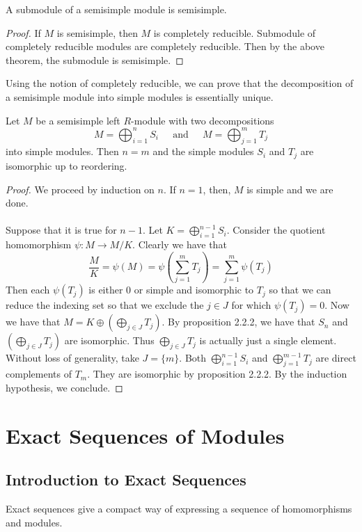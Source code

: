 \documentclass[a4paper]{article}
\begin{document}
\begin{crl}{}{} A submodule of a semisimple module is semisimple. 
\begin{proof}
If $M$ is semisimple, then $M$ is completely reducible. Submodule of completely reducible modules are completely reducible. Then by the above theorem, the submodule is semisimple. 
\end{proof}
\end{crl}

Using the notion of completely reducible, we can prove that the decomposition of a semisimple module into simple modules is essentially unique. 

\begin{prp}{}{} Let $M$ be a semisimple left $R$-module with two decompositions $$M=\bigoplus_{i=1}^nS_i\;\;\;\;\text{ and }\;\;\;\; M=\bigoplus_{j=1}^mT_j$$ into simple modules. Then $n=m$ and the simple modules $S_i$ and $T_j$ are isomorphic up to reordering. 
\begin{proof}
We proceed by induction on $n$. If $n=1$, then, $M$ is simple and we are done. \\~\\

Suppose that it is true for $n-1$. Let $K=\bigoplus_{i=1}^{n-1}S_i$. Consider the quotient homomorphism $\psi:M\to M/K$. Clearly we have that $$\frac{M}{K}=\psi(M)=\psi\left(\sum_{j=1}^mT_j\right)=\sum_{j=1}^m\psi(T_j)$$ Then each $\psi(T_j)$ is either $0$ or simple and isomorphic to $T_j$ so that we can reduce the indexing set so that we exclude the $j\in J$ for which $\psi(T_j)=0$. Now we have that $M=K\oplus\left(\bigoplus_{j\in J}T_j\right)$. By proposition 2.2.2, we have that $S_n$ and $\left(\bigoplus_{j\in J}T_j\right)$ are isomorphic. Thus $\bigoplus_{j\in J}T_j$ is actually just a single element. Without loss of generality, take $J=\{m\}$. Both $\bigoplus_{i=1}^{n-1}S_i$ and $\bigoplus_{j=1}^{m-1}T_j$ are direct complements of $T_m$. They are isomorphic by proposition 2.2.2. By the induction hypothesis, we conclude. 
\end{proof}
\end{prp}

\pagebreak
\section{Exact Sequences of Modules}
\subsection{Introduction to Exact Sequences}
Exact sequences give a compact way of expressing a sequence of homomorphisms and modules. 
\end{document}
